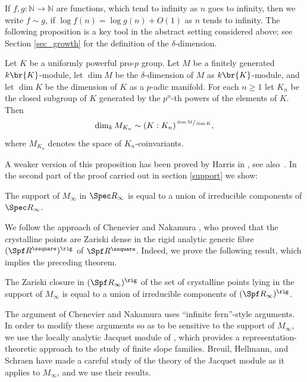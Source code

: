 If $f, g:\mathbb N\to \mathbb N$ are functions, which tend to infinity as $n$ goes to infinity, then we write $f\sim g$, if $\log f(n)=\log g(n) + O(1)$ as $n$ tends to infinity.
The following proposition is a key tool in the abstract setting considered above; see Section \ref{sec_growth} for the definition of the $\delta$-dimension.

\begin{prop}\label{growth_intro} Let $K$ be a uniformly powerful pro-$p$ group. Let $M$ be a
finitely generated $k\br{K}$-module, let $\dim M$ be the $\delta$-dimension of $M$ as $k\br{K}$-module, and let $\dim K$ be the dimension of $K$ as a $p$-adic manifold. For each $n\ge1$ let $K_n$ be the closed subgroup of $K$ generated by the $p^n$-th powers of the elements of $K$. Then
\[
\dim_k M_{K_n}\sim (K:K_n)^{\sfrac{\dim M}{\dim K}},
\]
where $M_{K_n}$ denotes the space of $K_n$-coinvariants.
\end{prop}

A weaker version of this proposition has been proved by Harris in \cite{harris}, see also~\cite{harris_err}. In the second part of the proof carried out in section
\ref{support} we show:

\begin{thm}\label{B} The support of $M_{\infty}$ in $\Spec R_{\infty}$
is equal to a union of irreducible components of $\Spec R_{\infty}$.
\end{thm}

We follow the approach of Chenevier \cite{Chenevier}
and Nakamura \cite{Nakamura}, who proved that
the crystalline points are Zariski dense in the rigid analytic generic
fibre $(\Spf R^\ssquare)^{\rig}$
of $\Spf R^\ssquare$. Indeed, we prove the following result,
which implies the preceding theorem.

\begin{thm}\label{C} The Zariski closure in $(\Spf R_{\infty})^{\rig}$
of the set of crystalline points lying in the support of $M_{\infty}$
is equal to
a union of irreducible components of $(\Spf R_{\infty})^{\rig}$.
\end{thm}

The argument of Chenevier and Nakamura uses ``infinite fern''-style
arguments. In order to modify these arguments so as to be sensitive
to the support of $M_{\infty}$, we use the locally analytic Jacquet
module of \cite{Jacquet-one}, which provides a representation-theoretic
approach to the study of finite slope families. Breuil, Hellmann,
and Schraen \cite{BHS} have made a careful study of the theory
of the Jacquet module as it applies to $M_{\infty}$, and we use
their results.

